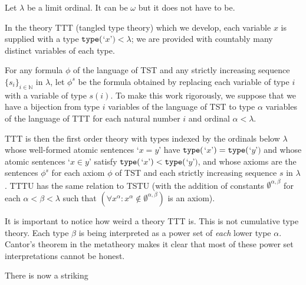 \documentclass{article}
\theoremstyle{definition}
\theoremstyle{remark}
\begin{document}
Let $\lambda$ be a limit ordinal.  It can be $\omega$ but it does not have to be.

In the theory TTT (tangled type theory) which we develop, each variable $x$ is supplied with a type ${\tt type}($`$x$'$) <\lambda$;  we are provided with countably many distinct variables of each type.

For any formula $\phi$ of the language of TST and any strictly increasing sequence $\{s_i\}_{i \in \mathbb N}$ in $\lambda$, let $\phi^s$ be the formula obtained by replacing each variable
of type $i$ with a variable of type $s(i)$.  To make this work rigorously, we suppose that we have a bijection from type $i$ variables of the language of TST to type $\alpha$ variables
of the language of TTT for each natural number $i$ and ordinal $\alpha<\lambda$.



TTT is then the first order theory with types indexed by the ordinals below $\lambda$ whose well-formed atomic sentences `$x=y$' have ${\tt type}($`$x$'$) = {\tt type}($`$y$'$)$ and whose atomic sentences `$x \in y$' satisfy ${\tt type}($`$x$'$) < {\tt type}($`$y$'$)$, and whose axioms are the sentences $\phi^s$ for each axiom $\phi$ of TST and each strictly increasing sequence $s$ in $\lambda$.  TTTU has the same relation to TSTU (with the addition of constants $\emptyset^{\alpha,\beta}$ for each $\alpha<\beta<\lambda$  such that $(\forall x^{\alpha} :x^{\alpha}\not\in \emptyset^{\alpha,\beta})$ is an axiom).



It is important to notice how weird a theory TTT is.  This is not cumulative type theory.  Each type $\beta$ is being interpreted as a power set of {\em each\/} lower type $\alpha$.  Cantor's theorem in the metatheory makes it clear that most of these power set interpretations cannot be honest.

There is now a striking
\end{document}
